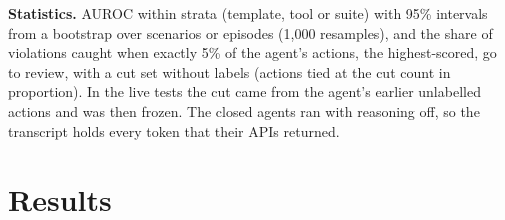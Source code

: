 \documentclass{article}
\begin{document}
\textbf{Statistics.} AUROC within strata (template, tool or suite) with 95\% intervals from a bootstrap over scenarios or episodes (1{,}000 resamples), and the share of violations caught when exactly 5\% of the agent's actions, the highest-scored, go to review, with a cut set without labels (actions tied at the cut count in proportion). In the live tests the cut came from the agent's earlier unlabelled actions and was then frozen. The closed agents ran with reasoning off, so the transcript holds every token that their APIs returned.

\section{Results}
\label{sec:results}
\end{document}
